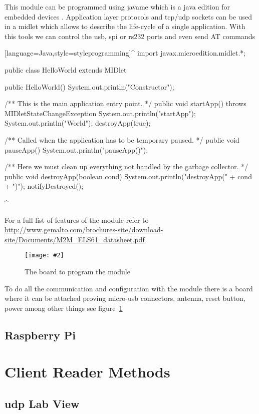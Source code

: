 \documentclass[hidelinks,11pt,a4paper,oneside,article]{memoir}
\numberwithin{equation}{chapter}
\newcommand{\putimage}[3][10] %
{
\begin{figure}[h]
	\centering
	\captionsetup{justification=centering}
	\texttt{[image: \#2]}
	\caption{#3}
	\label{fig:#2}
\end{figure}
}
\begin{document}
This module can be programmed using \gls{javame} which is a \gls{java} edition for embedded devices \cite{javame}. Application layer protocols and \gls{tcp}/\gls{udp} sockets can be used in a \gls{midlet} which allows to describe the life-cycle of a single application. With this tools we can control the \gls{usb}, \gls{spi} or \gls{rs232} ports and even send AT commands


[language=Java,style=styleprogramming]^
import javax.microedition.midlet.*;

public class HelloWorld extends MIDlet {
    
    public HelloWorld() {
        System.out.println("Constructor");
    }
    
    /** This is the main application entry point. */
    public void startApp() throws MIDletStateChangeException {
        System.out.println("startApp");
        System.out.println("\nHello World\n");
        destroyApp(true);
    }
    
    /**  Called when the application has to be temporary paused. */
    public void pauseApp() {
        System.out.println("pauseApp()");
    }
    
    /** Here we must clean up everything not handled by the garbage collector. */
    public void destroyApp(boolean cond) {
        System.out.println("destroyApp(" + cond + ")");
        notifyDestroyed();
    }
}
^ %


For a full list of features of the module refer to \url{http://www.gemalto.com/brochures-site/download-site/Documents/M2M_ELS61_datasheet.pdf}


	\putimage{lte_board}{The board to program the module}
To do all the communication and configuration with the module there is a board where it can be attached proving micro-usb connectors, antenna, reset button, power among other things see figure~\ref{fig:lte_board}





\subsection{Raspberry Pi}


\section{Client Reader Methods}
\subsection{\gls{udp} Lab View}
\end{document}
